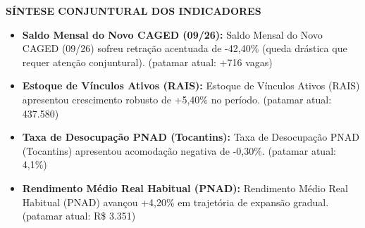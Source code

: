 \documentclass[10pt,a4paper]{article}
\begin{document}
{\begin{tikzpicture}[baseline=(box.base)]
\end{tikzpicture}\hfill%
%
}

\vspace{0.08cm}
\par\vspace{0.05cm}
\par\vspace{4pt}
{\fontsize{7.8}{9.4}\selectfont\bfseries\color{corprimaria}\MakeUppercase{Síntese Conjuntural dos Indicadores}}\par\vspace{2pt}
{\scriptsize\color{cinzatexto}
\begin{itemize}[leftmargin=10pt, itemsep=1.2pt, topsep=1pt, parsep=0pt]
   \item \textbf{\color{corprimaria}Saldo Mensal do Novo CAGED (09/26):} Saldo Mensal do Novo CAGED (09/26) sofreu retração acentuada de -42,40\% (queda drástica que requer atenção conjuntural). (patamar atual: +716 vagas)
   \item \textbf{\color{corprimaria}Estoque de Vínculos Ativos (RAIS):} Estoque de Vínculos Ativos (RAIS) apresentou crescimento robusto de +5,40\% no período. (patamar atual: 437.580)
   \item \textbf{\color{corprimaria}Taxa de Desocupação PNAD (Tocantins):} Taxa de Desocupação PNAD (Tocantins) apresentou acomodação negativa de -0,30\%. (patamar atual: 4,1\%)
   \item \textbf{\color{corprimaria}Rendimento Médio Real Habitual (PNAD):} Rendimento Médio Real Habitual (PNAD) avançou +4,20\% em trajetória de expansão gradual. (patamar atual: R\$ 3.351)
\end{itemize}
}
\par\vspace{0.05cm}
\end{document}
